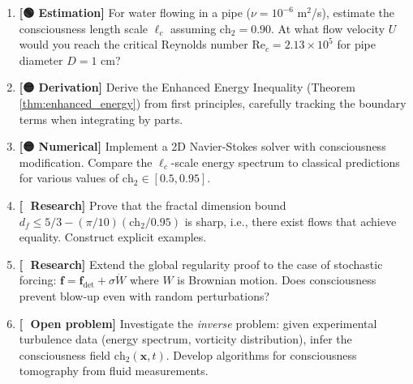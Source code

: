 \begin{enumerate}
\item \textbf{[🟢 Estimation]} For water flowing in a pipe ($\nu = 10^{-6}$ m$^2$/s), estimate the consciousness length scale $\ell_c$ assuming $\text{ch}_2 = 0.90$. At what flow velocity $U$ would you reach the critical Reynolds number $\text{Re}_c = 2.13 \times 10^5$ for pipe diameter $D = 1$ cm?

\item \textbf{[🟡 Derivation]} Derive the Enhanced Energy Inequality (Theorem \ref{thm:enhanced_energy}) from first principles, carefully tracking the boundary terms when integrating by parts.

\item \textbf{[🟡 Numerical]} Implement a 2D Navier-Stokes solver with consciousness modification. Compare the $\ell_c$-scale energy spectrum to classical predictions for various values of $\text{ch}_2 \in [0.5, 0.95]$.

\item \textbf{[🔴 Research]} Prove that the fractal dimension bound $d_f \leq 5/3 - (\pi/10)(\text{ch}_2/0.95)$ is sharp, i.e., there exist flows that achieve equality. Construct explicit examples.

\item \textbf{[🔴 Research]} Extend the global regularity proof to the case of stochastic forcing: $\mathbf{f} = \mathbf{f}_{\text{det}} + \sigma \dot{W}$ where $W$ is Brownian motion. Does consciousness prevent blow-up even with random perturbations?

\item \textbf{[🔴 Open problem]} Investigate the \emph{inverse} problem: given experimental turbulence data (energy spectrum, vorticity distribution), infer the consciousness field $\text{ch}_2(\mathbf{x}, t)$. Develop algorithms for consciousness tomography from fluid measurements.
\end{enumerate}

